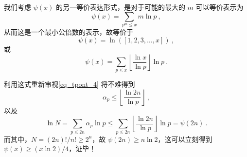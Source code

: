 我们考虑 $\psi(x)$ 的另一等价表达形式，是对于可能的最大的 $m$ 可以等价表示为
\begin{equation}
\psi(x) = \sum_{p^m \le x} m \ln p ~,
\end{equation}
从而这是一个最小公倍数的表示，故等价于
\begin{equation}
\psi(x) = \ln\left( [1, 2, 3, \dots, x] \right)~,
\end{equation}
或
\begin{equation}
\psi(x) = \sum_{p \le x} \left\lfloor \frac{\ln x}{\ln p} \right\rfloor \ln p ~.
\end{equation}

利用这式重新审视\autoref{eq_tpont_4} 将不难得到
\begin{equation}\label{eq_tpont_5}
\alpha_p \le \left \lfloor \frac{\ln 2n}{\ln p} \right \rfloor ~,
\end{equation}
以及
\begin{equation}
\ln N = \sum_{p \le 2n} \alpha_p \ln p \le \sum_{p \le 2n} \left\lfloor \frac{\ln 2n}{\ln p}  \right \rfloor \ln p= \psi(2n) ~.
\end{equation}
而其中，$N = (2n)!/n! \ge 2^n$，故 $\psi(2n) \ge n \ln 2$，这可以立刻得到 $\psi(x) \ge (x \ln 2)/4$，证毕！




